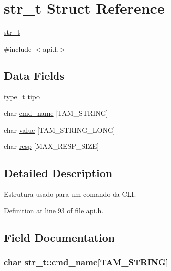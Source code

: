 \hypertarget{structstr__t}{
\section{str\_\-t Struct Reference}
\label{structstr__t}
}


\hyperlink{structstr__t}{str\_\-t}  




{\ttfamily \#include $<$api.h$>$}

\subsection*{Data Fields}
\begin{DoxyCompactItemize}
\item 
\hyperlink{api_8h_adee610a3c7375031538811d29f6a4124}{type\_\-t} \hyperlink{structstr__t_ab27624a13ae4ed3540ca512b85ff6335}{tipo}
\item 
char \hyperlink{structstr__t_aafd75dfe5a01461d919de0eb6604af55}{cmd\_\-name} \mbox{[}TAM\_\-STRING\mbox{]}
\item 
char \hyperlink{structstr__t_aa2a1a455cb1921c134c223939a18812d}{value} \mbox{[}TAM\_\-STRING\_\-LONG\mbox{]}
\item 
char \hyperlink{structstr__t_ad42e93fea3f08fbb36e52f2601766c19}{resp} \mbox{[}MAX\_\-RESP\_\-SIZE\mbox{]}
\end{DoxyCompactItemize}


\subsection{Detailed Description}
Estrutura usado para um comando da CLI. 

Definition at line 93 of file api.h.



\subsection{Field Documentation}
\hypertarget{structstr__t_aafd75dfe5a01461d919de0eb6604af55}{
\subsubsection[{cmd\_\-name}]{\setlength{\rightskip}{0pt plus 5cm}char {\bf str\_\-t::cmd\_\-name}\mbox{[}TAM\_\-STRING\mbox{]}}}
\label{structstr__t_aafd75dfe5a01461d919de0eb6604af55}



